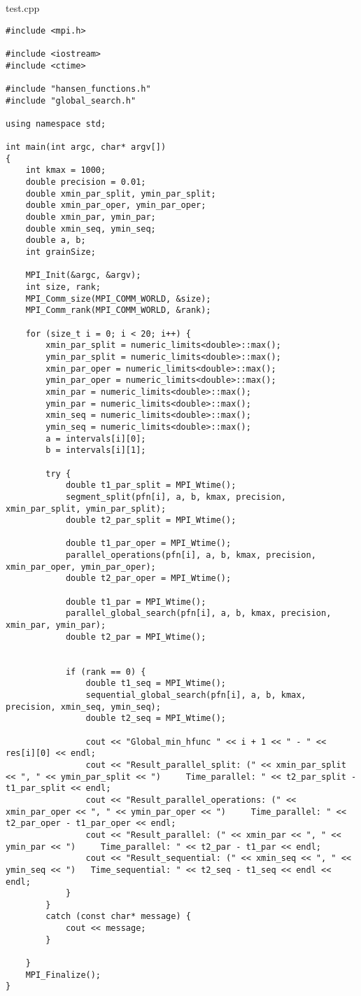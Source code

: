 \documentclass{report}
\begin{document}
test.cpp
\begin{lstlisting}
#include <mpi.h>

#include <iostream>
#include <ctime>

#include "hansen_functions.h"
#include "global_search.h"

using namespace std;

int main(int argc, char* argv[])
{
    int kmax = 1000;
    double precision = 0.01;
    double xmin_par_split, ymin_par_split;
    double xmin_par_oper, ymin_par_oper;
    double xmin_par, ymin_par;
    double xmin_seq, ymin_seq;
    double a, b;
    int grainSize;

    MPI_Init(&argc, &argv);
    int size, rank;
    MPI_Comm_size(MPI_COMM_WORLD, &size);
    MPI_Comm_rank(MPI_COMM_WORLD, &rank);

    for (size_t i = 0; i < 20; i++) {
        xmin_par_split = numeric_limits<double>::max();
        ymin_par_split = numeric_limits<double>::max();
        xmin_par_oper = numeric_limits<double>::max();
        ymin_par_oper = numeric_limits<double>::max();
        xmin_par = numeric_limits<double>::max();
        ymin_par = numeric_limits<double>::max();
        xmin_seq = numeric_limits<double>::max();
        ymin_seq = numeric_limits<double>::max();
        a = intervals[i][0];
        b = intervals[i][1];

        try {
            double t1_par_split = MPI_Wtime();
            segment_split(pfn[i], a, b, kmax, precision, xmin_par_split, ymin_par_split);
            double t2_par_split = MPI_Wtime();

            double t1_par_oper = MPI_Wtime();
            parallel_operations(pfn[i], a, b, kmax, precision, xmin_par_oper, ymin_par_oper);
            double t2_par_oper = MPI_Wtime();

            double t1_par = MPI_Wtime();
            parallel_global_search(pfn[i], a, b, kmax, precision, xmin_par, ymin_par);
            double t2_par = MPI_Wtime();


            if (rank == 0) {
                double t1_seq = MPI_Wtime();
                sequential_global_search(pfn[i], a, b, kmax, precision, xmin_seq, ymin_seq);
                double t2_seq = MPI_Wtime();

                cout << "Global_min_hfunc " << i + 1 << " - " << res[i][0] << endl;
                cout << "Result_parallel_split: (" << xmin_par_split << ", " << ymin_par_split << ")     Time_parallel: " << t2_par_split - t1_par_split << endl;
                cout << "Result_parallel_operations: (" << xmin_par_oper << ", " << ymin_par_oper << ")     Time_parallel: " << t2_par_oper - t1_par_oper << endl;
                cout << "Result_parallel: (" << xmin_par << ", " << ymin_par << ")     Time_parallel: " << t2_par - t1_par << endl;
                cout << "Result_sequential: (" << xmin_seq << ", " << ymin_seq << ")   Time_sequential: " << t2_seq - t1_seq << endl << endl;
            }
        }
        catch (const char* message) {
            cout << message;
        }

    }
    MPI_Finalize();
}

\end{lstlisting}
\end{document}
